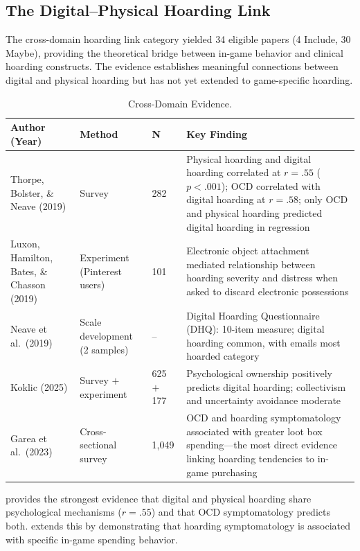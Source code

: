 \documentclass[12pt]{article}
\begin{document}
\subsection{The Digital--Physical Hoarding Link}

The cross-domain hoarding link category yielded 34 eligible papers (4 Include, 30 Maybe), providing the theoretical bridge between in-game behavior and clinical hoarding constructs. The evidence establishes meaningful connections between digital and physical hoarding but has not yet extended to game-specific hoarding.

\begin{table}[ht]
\centering
\caption{Cross-Domain Evidence.}
\small
\begin{tabular}{p{3.2cm}p{3cm}p{1.5cm}p{6cm}}
\toprule
Author (Year) & Method & N & Key Finding \\
\midrule
Thorpe, Bolster, \& Neave (2019) & Survey & 282 & Physical hoarding and digital hoarding correlated at $r = .55$ ($p < .001$); OCD correlated with digital hoarding at $r = .58$; only OCD and physical hoarding predicted digital hoarding in regression \\
Luxon, Hamilton, Bates, \& Chasson (2019) & Experiment (Pinterest users) & 101 & Electronic object attachment mediated relationship between hoarding severity and distress when asked to discard electronic possessions \\
Neave et al.\ (2019) & Scale development (2 samples) & -- & Digital Hoarding Questionnaire (DHQ): 10-item measure; digital hoarding common, with emails most hoarded category \\
Koklic (2025) & Survey $+$ experiment & 625 $+$ 177 & Psychological ownership positively predicts digital hoarding; collectivism and uncertainty avoidance moderate \\
Garea et al.\ (2023) & Cross-sectional survey & 1,049 & OCD and hoarding symptomatology associated with greater loot box spending---the most direct evidence linking hoarding tendencies to in-game purchasing \\
\bottomrule
\end{tabular}
\end{table}

\citet{Thorpe2019} provides the strongest evidence that digital and physical hoarding share psychological mechanisms ($r = .55$) and that OCD symptomatology predicts both. \citet{Garea2023} extends this by demonstrating that hoarding symptomatology is associated with specific in-game spending behavior.
\end{document}
